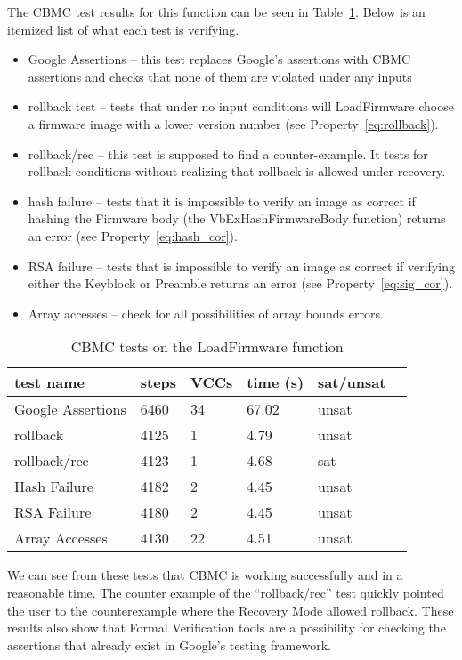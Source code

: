 The CBMC test results for this function can be seen in Table~\ref{ldfw_results}. 
Below is an itemized list of what each test is verifying.

\begin{itemize}
 \item  Google Assertions -- this test replaces Google's assertions with CBMC assertions and checks that none of them are violated under any inputs
 \item  rollback test -- tests that under no input conditions will LoadFirmware choose a firmware image with a lower version number (see Property~\ref{eq:rollback}).
 \item  rollback/rec  -- this test is supposed to find a counter-example. It tests for rollback conditions without realizing that rollback is allowed under recovery. 
 \item  hash failure -- tests that it is impossible to verify an image as correct  if hashing the Firmware body (the VbExHashFirmwareBody function) returns an error (see Property~\ref{eq:hash_cor}).
 \item  RSA failure -- tests that is impossible to verify an image as correct if verifying either the Keyblock or Preamble returns an error (see Property~\ref{eq:sig_cor}).
 \item  Array accesses -- check for all possibilities of array bounds errors.
\end{itemize}

\begin{table}[!htbp]
    \centering
    \caption{CBMC tests on the LoadFirmware function}\label{ldfw_results}
    \begin{tabular}{llllll}
        \toprule
        test name & steps & VCCs  & time (s) & sat/unsat  \\ \bottomrule
        Google Assertions & 6460 & 34 & 67.02 & unsat \\
        rollback     & 4125 & 1 & 4.79 & unsat \\
        rollback/rec & 4123 & 1 & 4.68 & sat \\
        Hash Failure & 4182 & 2 & 4.45 & unsat \\
        RSA  Failure & 4180 & 2 & 4.45 & unsat \\
        Array Accesses & 4130 & 22 & 4.51 & unsat \\\bottomrule
    \end{tabular}
\end{table}

We can see from these tests that CBMC is working successfully and in a reasonable time.
The counter example of the ``rollback/rec'' test quickly pointed the user to the counterexample where the Recovery Mode allowed rollback.
These results also show that Formal Verification tools are a possibility for checking the assertions that already exist in Google's testing framework.

